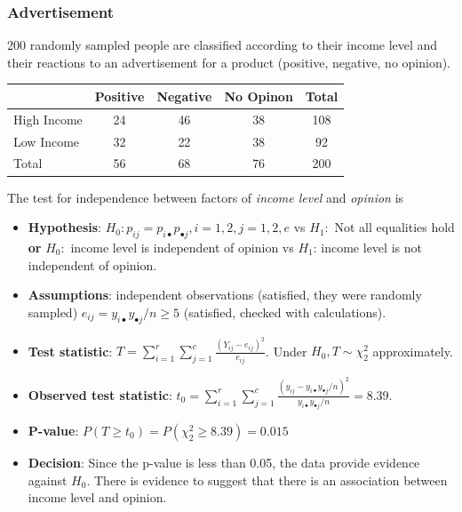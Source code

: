 \documentclass[a4paper]{article}\usepackage[]{graphicx}\usepackage[]{xcolor}
\begin{document}
\subsubsection{Advertisement}
200 randomly sampled people are classified according to their income level and their reactions to an advertisement for a product (positive, negative, no opinion).
\begin{table}[H]
	\centering
	\begin{tabular}{@{}lccc|c@{}}
	\toprule
				& Positive & Negative & No Opinon & Total \\ \midrule
	High Income & 24       & 46       & 38        & 108   \\
	Low Income  & 32       & 22       & 38        & 92    \\ \midrule
	Total		& 56       & 68       & 76        & 200   \\ \bottomrule
	\end{tabular}
\end{table}
The test for independence between factors of \textit{income level} and \textit{opinion} is
\begin{itemize}
	\item \textbf{Hypothesis}: \( H_0: p_{ij} = p_{i \bullet} p_{\bullet j}, i = 1,2, j = 1,2,e \) vs \( H_1: \) Not all equalities hold \textbf{or} \( H_0: \) income level is independent of opinion vs \( H_1 \):  income level is not independent of opinion. 
	\item \textbf{Assumptions}: independent observations (satisfied, they were randomly sampled) \( e_{ij} =y_{i \bullet} y_{\bullet j}/n \geq 5 \)  (satisfied, checked with calculations).
	\item \textbf{Test statistic}: \( T = \sum\limits_{i=1}^{r}\sum\limits_{j=1}^{c} \frac{(Y_{ij} - e_{ij})^2}{e_{ij}} \). Under \( H_0, T \sim \chi^2_2 \) approximately.
	\item \textbf{Observed test statistic}: \( t_0 = \sum_{i=1}^{r}\sum_{j=1}^{c}\frac{(y_{ij} - y_{i \bullet} y_{\bullet j}/n)^2}{y_{i \bullet}y_{\bullet j}/n} = 8.39 \).
	\item \textbf{P-value}: \( P(T\geq t_0) = P(\chi^2_2 \geq 8.39) = 0.015 \)
	\item \textbf{Decision}: Since the p-value is less than 0.05, the data provide evidence against \( H_0 \). There is evidence to suggest that there is an association between income level and opinion.
\end{itemize}
\end{document}
